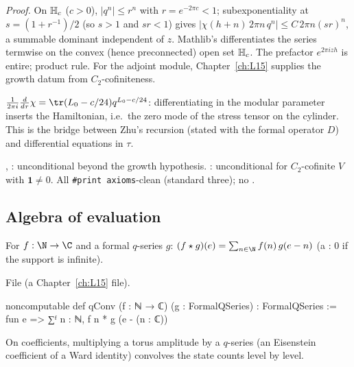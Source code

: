 \noindent\emph{Proof.} On $\mathbb{H}_c$ ($c>0$), $|q^n|\le r^n$ with $r = e^{-2\pi c}<1$; subexponentiality at
$s = (1+r^{-1})/2$ (so $s>1$ and $sr<1$) gives $|\chi(h+n)\,2\pi n\,q^n|\le C\,2\pi n(sr)^n$, a summable dominant
independent of $z$. Mathlib's  differentiates the series termwise on the convex
(hence preconnected) open set $\mathbb{H}_c$. The prefactor $e^{2\pi izh}$ is entire; product rule. For the adjoint
module, Chapter~\ref{ch:L15} supplies the growth datum from $C_2$-cofiniteness.
\begin{physics}
$\frac{1}{2\pi i}\frac{d}{d\tau}\chi = \tr(L_0 - c/24)q^{L_0-c/24}$: differentiating in the modular parameter inserts the
Hamiltonian, i.e.\ the zero mode of the stress tensor on the cylinder. This is the bridge between Zhu's recursion (stated
with the formal operator $D$) and differential equations in $\tau$.
\end{physics}
\begin{status}
, : unconditional beyond the growth hypothesis. :
unconditional for $C_2$-cofinite $V$ with $\mathbf 1\neq0$. All \texttt{\#print axioms}-clean (standard three); no
.
\end{status}

\subsection{Algebra of evaluation}

\begin{definition}\label{l14:def:qConv}
For $f:\N\to\C$ and a formal $q$-series $g$: $(f\star g)(e) = \sum_{n\in\N}f(n)\,g(e-n)$ (a : $0$ if the support
is infinite).
\end{definition}
\noindent File  (a Chapter~\ref{ch:L15} file).
\begin{leancode}
noncomputable def qConv (f : ℕ → ℂ) (g : FormalQSeries) : FormalQSeries :=
  fun e => ∑ᶠ n : ℕ, f n * g (e - (n : ℂ))
\end{leancode}
\begin{physics}
On coefficients, multiplying a torus amplitude by a $q$-series (an Eisenstein coefficient of a Ward identity) convolves the state counts level by level.
\end{physics}

